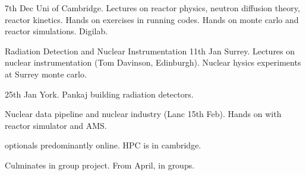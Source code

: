 7th Dec Uni of Cambridge. Lectures on reactor physics, neutron diffusion theory, reactor kinetics. Hands on exercises in running codes. Hands on monte carlo and reactor simulations. Digilab. 


Radiation Detection and Nuclear Instrumentation
11th Jan Surrey. Lectures on nuclear instrumentation (Tom Davinson, Edinburgh). Nuclear hysics experiments at Surrey monte carlo. 

25th Jan York. Pankaj building radiation detectors. 

Nuclear data pipeline and nuclear industry (Lanc 15th Feb). Hands on with reactor simulator and AMS. 

optionals predominantly online. HPC is in cambridge. 

Culminates in group project. From April, in groups.